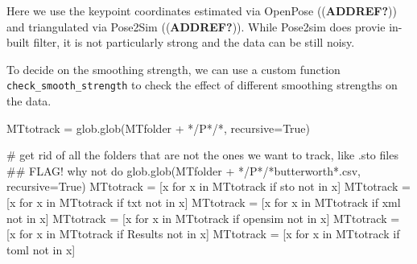 \documentclass[
  letterpaper,
  DIV=11,
  numbers=noendperiod]{scrreprt}
\newenvironment{Shaded}{\begin{snugshade}}{\end{snugshade}}
\newcommand{\CommentTok}[1]{\textcolor[rgb]{0.37,0.37,0.37}{#1}}
\newcommand{\ControlFlowTok}[1]{\textcolor[rgb]{0.00,0.23,0.31}{#1}}
\newcommand{\KeywordTok}[1]{\textcolor[rgb]{0.00,0.23,0.31}{#1}}
\newcommand{\NormalTok}[1]{\textcolor[rgb]{0.00,0.23,0.31}{#1}}
\newcommand{\OperatorTok}[1]{\textcolor[rgb]{0.37,0.37,0.37}{#1}}
\newcommand{\StringTok}[1]{\textcolor[rgb]{0.13,0.47,0.30}{#1}}
\newcommand{\VariableTok}[1]{\textcolor[rgb]{0.07,0.07,0.07}{#1}}
\begin{document}
Here we use the keypoint coordinates estimated via OpenPose
((\textbf{ADDREF?})) and triangulated via Pose2Sim ((\textbf{ADDREF?})).
While Pose2sim does provie in-built filter, it is not particularly
strong and the data can be still noisy.

To decide on the smoothing strength, we can use a custom function
\texttt{check\_smooth\_strength} to check the effect of different
smoothing strengths on the data.

\begin{Shaded}
\begin{Highlighting}[]
\NormalTok{MTtotrack }\OperatorTok{=}\NormalTok{ glob.glob(MTfolder }\OperatorTok{+} \StringTok{\textquotesingle{}*/P*/*\textquotesingle{}}\NormalTok{, recursive}\OperatorTok{=}\VariableTok{True}\NormalTok{)}

\CommentTok{\# get rid of all the folders that are not the ones we want to track, like .sto files}
    \CommentTok{\#\# FLAG! why not do glob.glob(MTfolder + \textquotesingle{}*/P*/*butterworth*.csv\textquotesingle{}, recursive=True)}
\NormalTok{MTtotrack }\OperatorTok{=}\NormalTok{ [x }\ControlFlowTok{for}\NormalTok{ x }\KeywordTok{in}\NormalTok{ MTtotrack }\ControlFlowTok{if} \StringTok{\textquotesingle{}sto\textquotesingle{}} \KeywordTok{not} \KeywordTok{in}\NormalTok{ x]}
\NormalTok{MTtotrack }\OperatorTok{=}\NormalTok{ [x }\ControlFlowTok{for}\NormalTok{ x }\KeywordTok{in}\NormalTok{ MTtotrack }\ControlFlowTok{if} \StringTok{\textquotesingle{}txt\textquotesingle{}} \KeywordTok{not} \KeywordTok{in}\NormalTok{ x]}
\NormalTok{MTtotrack }\OperatorTok{=}\NormalTok{ [x }\ControlFlowTok{for}\NormalTok{ x }\KeywordTok{in}\NormalTok{ MTtotrack }\ControlFlowTok{if} \StringTok{\textquotesingle{}xml\textquotesingle{}} \KeywordTok{not} \KeywordTok{in}\NormalTok{ x]}
\NormalTok{MTtotrack }\OperatorTok{=}\NormalTok{ [x }\ControlFlowTok{for}\NormalTok{ x }\KeywordTok{in}\NormalTok{ MTtotrack }\ControlFlowTok{if} \StringTok{\textquotesingle{}opensim\textquotesingle{}} \KeywordTok{not} \KeywordTok{in}\NormalTok{ x]}
\NormalTok{MTtotrack }\OperatorTok{=}\NormalTok{ [x }\ControlFlowTok{for}\NormalTok{ x }\KeywordTok{in}\NormalTok{ MTtotrack }\ControlFlowTok{if} \StringTok{\textquotesingle{}Results\textquotesingle{}} \KeywordTok{not} \KeywordTok{in}\NormalTok{ x]}
\NormalTok{MTtotrack }\OperatorTok{=}\NormalTok{ [x }\ControlFlowTok{for}\NormalTok{ x }\KeywordTok{in}\NormalTok{ MTtotrack }\ControlFlowTok{if} \StringTok{\textquotesingle{}toml\textquotesingle{}} \KeywordTok{not} \KeywordTok{in}\NormalTok{ x]}


\end{Highlighting}
\end{Shaded}
\end{document}
